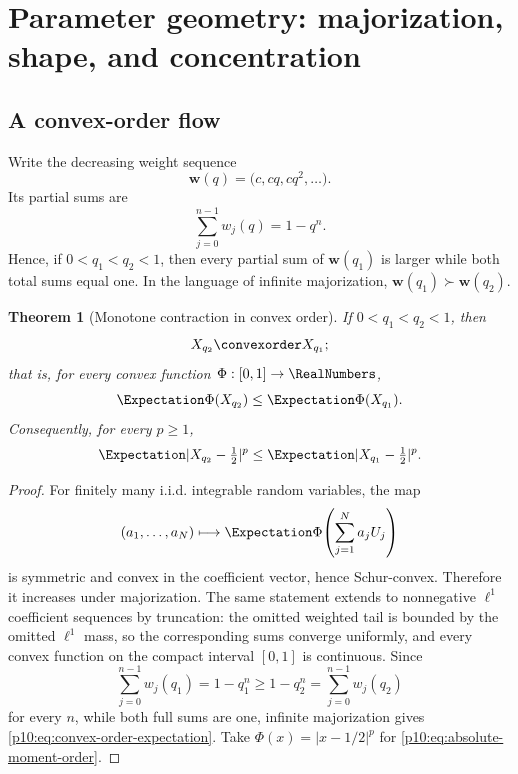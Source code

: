 \documentclass[11pt]{article}
\numberwithin{equation}{section}
\newtheorem{theorem}{Theorem}[section]
\theoremstyle{definition}
\theoremstyle{remark}
\begin{document}
\section{Parameter geometry: majorization, shape, and concentration}
\label{p10:sec:geometry}

\subsection{A convex-order flow}

Write the decreasing weight sequence
\[
 \bm w(q)=\bigl(c,cq,cq^2,\ldots\bigr).
\]
Its partial sums are
\[
 \sum_{j=0}^{n-1}w_j(q)=1-q^n.
\]
Hence, if $0<q_1<q_2<1$, then every partial sum of $\bm w(q_1)$ is larger while both total
sums equal one.  In the language of infinite majorization,
\(
 \bm w(q_1)\succ\bm w(q_2).
\)

\begin{theorem}[Monotone contraction in convex order]
\label{p10:thm:convex-order}
If $0<q_1<q_2<1$, then
\begin{equation}
 X_{q_2}\convexorder X_{q_1};                               \label{p10:eq:convex-order}
\end{equation}
that is, for every convex function $\Phi:[0,1]\to\RealNumbers$,
\begin{equation}
 \Expectation\Phi(X_{q_2})\le\Expectation\Phi(X_{q_1}).                         \label{p10:eq:convex-order-expectation}
\end{equation}
Consequently, for every $p\ge1$,
\begin{equation}
 \Expectation|X_{q_2}-\tfrac12|^p
 \le \Expectation|X_{q_1}-\tfrac12|^p.                               \label{p10:eq:absolute-moment-order}
\end{equation}
\end{theorem}

\begin{proof}
For finitely many i.i.d. integrable random variables, the map
\[
 (a_1,\ldots,a_N)\longmapsto
 \Expectation\Phi\!\left(\sum_{j=1}^Na_jU_j\right)
\]
is symmetric and convex in the coefficient vector, hence Schur-convex.  Therefore it
increases under majorization.  The same statement extends to nonnegative $\ell^1$ coefficient
sequences by truncation: the omitted weighted tail is bounded by the omitted $\ell^1$ mass,
so the corresponding sums converge uniformly, and every convex function on the compact
interval $[0,1]$ is continuous.  Since
\[
 \sum_{j=0}^{n-1}w_j(q_1)=1-q_1^n\ge1-q_2^n
 =\sum_{j=0}^{n-1}w_j(q_2)
\]
for every $n$, while both full sums are one, infinite majorization gives
\eqref{p10:eq:convex-order-expectation}.  Take
$\Phi(x)=|x-1/2|^p$ for \eqref{p10:eq:absolute-moment-order}.
\end{proof}
\end{document}
